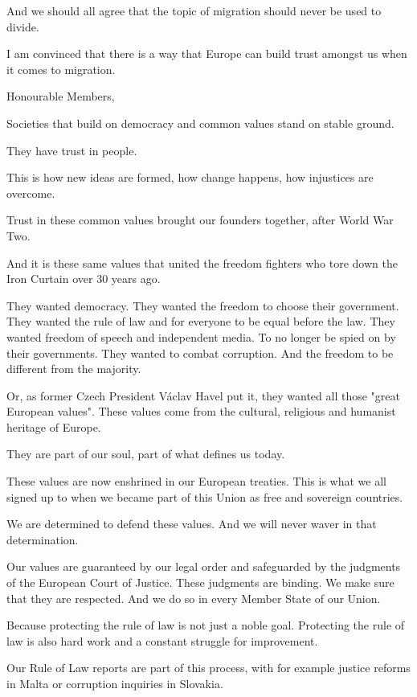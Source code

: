 \documentclass[a4paper,11pt]{article}
\begin{document}
And we should all agree that the topic of migration should never be used to divide.

I am convinced that there is a way that Europe can build trust amongst us when it comes to migration.

 

Honourable Members,

Societies that build on democracy and common values stand on stable ground.

They have trust in people.

This is how new ideas are formed, how change happens, how injustices are overcome.

Trust in these common values brought our founders together, after World War Two.

And it is these same values that united the freedom fighters who tore down the Iron Curtain over 30 years ago.

They wanted democracy.
They wanted the freedom to choose their government.
They wanted the rule of law and for everyone to be equal before the law.
They wanted freedom of speech and independent media. To no longer be spied on by their governments.
They wanted to combat corruption. And the freedom to be different from the majority.

Or, as former Czech President Václav Havel put it, they wanted all those "great European values". These values come from the cultural, religious and humanist heritage of Europe.

They are part of our soul, part of what defines us today.

These values are now enshrined in our European treaties. This is what we all signed up to when we became part of this Union as free and sovereign countries.

We are determined to defend these values. And we will never waver in that determination.

Our values are guaranteed by our legal order and safeguarded by the judgments of the European Court of Justice. These judgments are binding. We make sure that they are respected. And we do so in every Member State of our Union.

Because protecting the rule of law is not just a noble goal. Protecting the rule of law is also hard work and a constant struggle for improvement.

Our Rule of Law reports are part of this process, with for example justice reforms in Malta or corruption inquiries in Slovakia.
\end{document}
